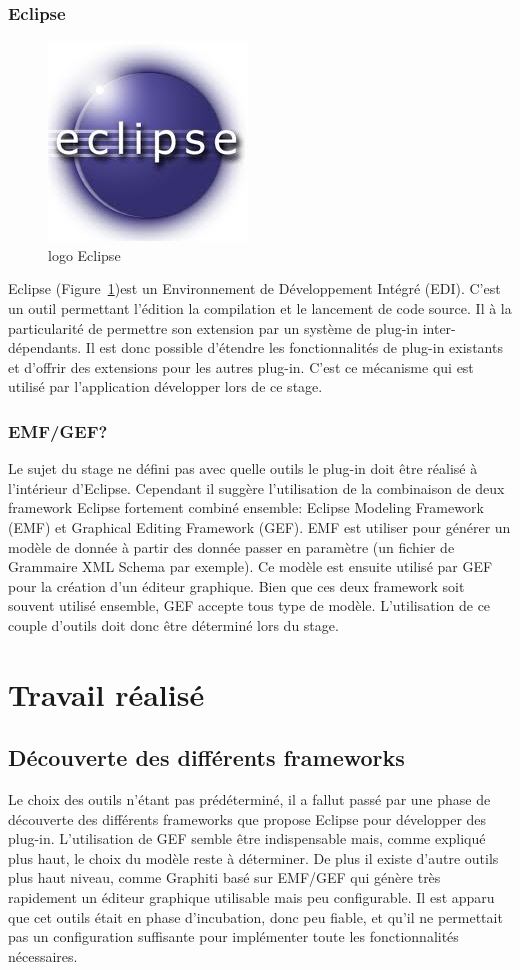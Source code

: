 \documentclass{article}
\begin{document}
	\subsubsection{Eclipse}
		\begin{figure}[!h]
		  \raggedright
		  \includegraphics[scale=0.3]{img/logo_eclipse.jpeg}
		  \caption{logo Eclipse}
		  \label{logo_eclipse}
		\end{figure}
		Eclipse (Figure~\ref{logo_eclipse})est un Environnement de Développement Intégré (EDI). C'est un outil permettant l'édition la compilation et le lancement de code source. Il à la particularité de permettre son extension par un système de plug-in inter-dépendants. Il est donc possible d'étendre les fonctionnalités de plug-in existants et d'offrir des extensions pour les autres plug-in. C'est ce mécanisme qui est utilisé par l'application développer lors de ce stage.
	\subsubsection{EMF/GEF?}
	Le sujet du stage ne défini pas avec quelle outils le plug-in doit être réalisé à l'intérieur d'Eclipse. Cependant il suggère l'utilisation de la combinaison de deux framework Eclipse fortement combiné ensemble: Eclipse Modeling Framework (EMF) et Graphical Editing Framework (GEF). EMF est utiliser pour générer un modèle de donnée à partir des donnée passer en paramètre (un fichier de Grammaire XML Schema par exemple). Ce modèle est ensuite utilisé par GEF pour la création d'un éditeur graphique. Bien que ces deux framework soit souvent utilisé ensemble, GEF accepte tous type de modèle. L'utilisation de ce couple d'outils doit donc être déterminé lors du stage.

\section{Travail réalisé}
    \subsection{Découverte des différents frameworks}
    	Le choix des outils n'étant pas prédéterminé, il a fallut passé par une phase de découverte des différents frameworks que propose Eclipse pour développer des plug-in. L'utilisation de GEF semble être indispensable mais, comme expliqué plus haut, le choix du modèle reste à déterminer. De plus il existe d'autre outils plus haut niveau, comme Graphiti basé sur EMF/GEF qui génère très rapidement un éditeur graphique utilisable mais peu configurable. Il est apparu que cet outils était en phase d'incubation, donc peu fiable, et qu'il ne permettait pas un configuration suffisante pour implémenter toute les fonctionnalités nécessaires.
\end{document}
